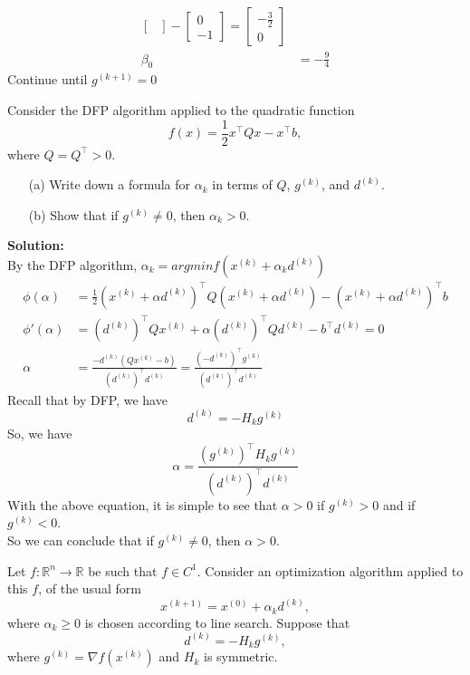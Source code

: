 \documentclass{article}
\begin{document}
\begin{enumerate}
\begin{align*}
\begin{bmatrix}
  \end{bmatrix} - \begin{bmatrix}
    0 \\ -1
  \end{bmatrix} = \begin{bmatrix}
    -\frac{3}{2} \\ 0
  \end{bmatrix} \\
  \beta_0 &= -\frac{9}{4}
\end{align*}
Continue until $g^{(k+1)} = 0$ 
\bigbreak
\begin{bb}
\item
  Consider the DFP algorithm applied to the quadratic function
\[
f(x) = \frac{1}{2}x^\top Qx - x^\top b,
\]
where $Q = Q^\top > 0$.

\begin{enumerate}
    \item[(a)] Write down a formula for $\alpha_k$ in terms of $Q$, $g^{(k)}$, and $d^{(k)}$.
    \item[(b)] Show that if $g^{(k)} \neq 0$, then $\alpha_k > 0$.
\end{enumerate}
\end{bb}
\textbf{Solution:}\\
By the DFP algorithm,  $\alpha_k = argminf(x^{(k)} + \alpha_k d^{(k)})$
\begin{align*}
  \phi(\alpha) &= \frac{1}{2}(x^{(k)} + \alpha d^{(k)})^\top Q(x^{(k)} + \alpha d^{(k)}) - (x^{(k)} + \alpha d^{(k)})^\top b \\
  \phi'(\alpha) &= (d^{(k)})^\top Qx^{(k)} + \alpha (d^{(k)})^\top Qd^{(k)} - b^\top d^{(k)}  = 0\\ 
  \alpha & = \frac{-d^{(k)}(Qx^{(k)}-b)}{(d^{(k)})^\top d^{(k)}} = \frac{(-d^{(k)})^\top g^{(k)}}{(d^{(k)})^\top d^{(k)}}
\end{align*}
Recall that by DFP, we have 
\[ d^{(k)} =  -H_kg^{(k)}\]
So, we have
\[
  \alpha = \frac{(g^{(k)})^\top H_k g^{(k)}}{(d^{(k)})^\top d^{(k)}}
  \]
With the above equation, it is simple to see that $\alpha > 0$ if $g^{(k)} > 0$ and if $g^{(k)} < 0$. \\
So we can conclude that if $g^{(k)} \neq 0$, then $\alpha > 0$.

\bigbreak
\begin{bb}
  \item
  Let $f : \mathbb{R}^n \to \mathbb{R}$ be such that $f \in C^1$. Consider an optimization algorithm applied to this $f$, of the usual form 
\[
x^{(k+1)} = x^{(0)} + \alpha_k d^{(k)},
\]
where $\alpha_k \geq 0$ is chosen according to line search. Suppose that 
\[
d^{(k)} = -H_k g^{(k)},
\]
where $g^{(k)} = \nabla f(x^{(k)})$ and $H_k$ is symmetric.


\end{bb}
\end{enumerate}
\end{document}
